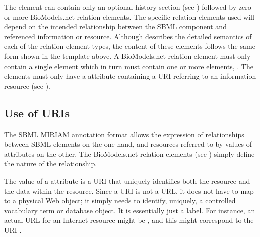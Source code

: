 The  element can contain only an optional
history section (see )
followed by zero or more BioModels.net relation elements.  The
specific relation elements used will depend on the intended
relationship between the SBML component and referenced information
or resource.  Although 
describes the detailed semantics of each of the relation element
types, the content of these elements follows the same form shown
in the template above.  A BioModels.net relation element must only
contain a single  element which in turn must 
contain one or more  elements, .
The 
elements must only have a  attribute
containing a URI referring to an information resource (see
).




\subsection{Use of URIs}
\label{sec:uri-in-annotation}

The SBML MIRIAM annotation format allows the expression of
relationships between SBML elements on the one hand, and resources
referred to by values of  attributes on the
other.  The BioModels.net relation elements (see
) simply define the
nature of the relationship.

The value of a  attribute is a URI that
uniquely identifies both the resource and the data within the
resource.  Since a URI is not a URL, it does not have to map to a
physical Web object; it simply needs to identify, uniquely, a
controlled vocabulary term or database object.  It is essentially
just a label.  For instance, an actual URL for an Internet
resource might be , and
this might correspond to the URI .

